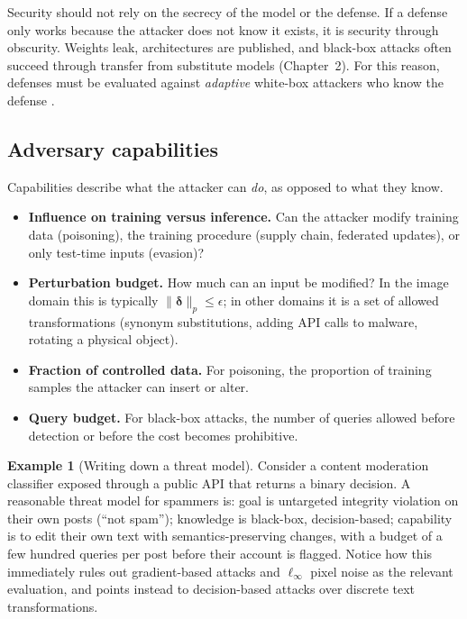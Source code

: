 \documentclass[10pt,a4paper]{extarticle}
\theoremstyle{definition}
\newtheorem{example}{Example}[section]
\newcommand{\bdelta}{\boldsymbol{\delta}}
\begin{document}
\begin{warnbox}
Security should not rely on the secrecy of the model or the defense. If a defense only works because the attacker does not know it exists, it is security through obscurity. Weights leak, architectures are published, and black-box attacks often succeed through transfer from substitute models (Chapter~2). For this reason, defenses must be evaluated against \emph{adaptive} white-box attackers who know the defense \citep{carlini2019evaluating,tramer2020adaptive}.
\end{warnbox}

\subsection{Adversary capabilities}

Capabilities describe what the attacker can \emph{do}, as opposed to what they know.

\begin{itemize}
  \item \textbf{Influence on training versus inference.} Can the attacker modify training data (poisoning), the training procedure (supply chain, federated updates), or only test-time inputs (evasion)?
  \item \textbf{Perturbation budget.} How much can an input be modified? In the image domain this is typically \(\|\bdelta\|_p \le \epsilon\); in other domains it is a set of allowed transformations (synonym substitutions, adding API calls to malware, rotating a physical object).
  \item \textbf{Fraction of controlled data.} For poisoning, the proportion of training samples the attacker can insert or alter.
  \item \textbf{Query budget.} For black-box attacks, the number of queries allowed before detection or before the cost becomes prohibitive.
\end{itemize}

\begin{example}[Writing down a threat model]
Consider a content moderation classifier exposed through a public API that returns a binary decision. A reasonable threat model for spammers is: goal is untargeted integrity violation on their own posts (\enquote{not spam}); knowledge is black-box, decision-based; capability is to edit their own text with semantics-preserving changes, with a budget of a few hundred queries per post before their account is flagged. Notice how this immediately rules out gradient-based attacks and \(\ell_\infty\) pixel noise as the relevant evaluation, and points instead to decision-based attacks over discrete text transformations.
\end{example}
\end{document}
